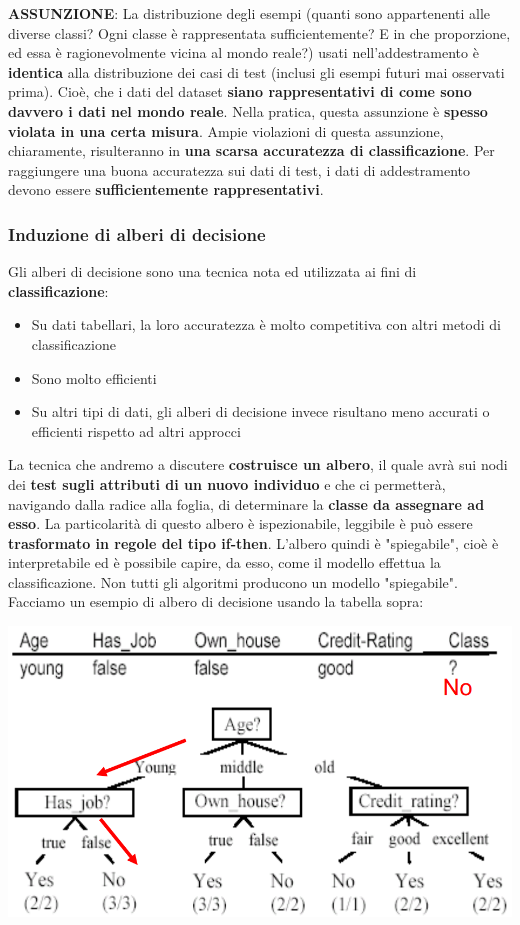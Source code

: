 \documentclass[12pt]{article}
\begin{document}
\textbf{ASSUNZIONE}: La distribuzione degli esempi (quanti sono appartenenti alle diverse  classi? Ogni classe è rappresentata sufficientemente? E in che proporzione, ed essa è ragionevolmente vicina al mondo reale?) usati nell'addestramento è \textbf{identica} alla distribuzione dei casi di test (inclusi gli esempi futuri mai osservati prima). Cioè, che i dati
del dataset \textbf{siano rappresentativi di come sono davvero i dati nel mondo reale}. \newline
Nella pratica, questa assunzione è \textbf{spesso violata in una certa misura}. Ampie violazioni di questa assunzione, chiaramente, risulteranno in \textbf{una scarsa accuratezza di classificazione}.
Per raggiungere una buona accuratezza sui dati di test, i dati di addestramento devono essere \textbf{sufficientemente rappresentativi}.
\subsubsection{Induzione di alberi di decisione}
Gli alberi di decisione sono una tecnica nota ed utilizzata ai fini di \textbf{classificazione}:
\begin{itemize}
    \item Su dati tabellari, la loro accuratezza è molto competitiva con altri metodi di classificazione
    \item Sono molto efficienti
    \item Su altri tipi di dati, gli alberi di decisione invece risultano meno accurati o efficienti rispetto ad altri approcci
\end{itemize}
La tecnica che andremo a discutere \textbf{costruisce un albero}, il quale avrà sui nodi dei \textbf{test sugli attributi di un nuovo individuo} e che ci permetterà, navigando dalla radice alla foglia, di determinare la \textbf{classe da assegnare ad esso}.
La particolarità di questo albero è ispezionabile, leggibile è può essere \textbf{trasformato in regole del tipo if-then}. L'albero quindi è "spiegabile", cioè è interpretabile ed è possibile capire, da esso, come il modello effettua la classificazione. Non tutti gli algoritmi
producono un modello "spiegabile". Facciamo un esempio di albero di decisione usando la tabella sopra:
\begin{center}
    \includegraphics[width =0.80\linewidth]{Images/70.PNG}
\end{center}
\end{document}
